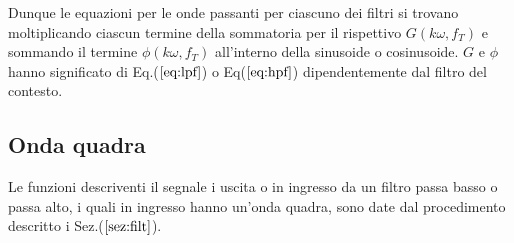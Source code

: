 \documentclass{article}
\begin{document}
    Dunque le equazioni per le onde passanti per ciascuno dei filtri si trovano
    moltiplicando ciascun termine della sommatoria per il rispettivo 
    $G \left( k\omega,f_T\right)$ e sommando il termine $\phi \left( k\omega,f_T\right)$ 
    all'interno della sinusoide o cosinusoide. $G$ e $\phi$ hanno significato di Eq.($\ref{eq:lpf}$)
    o Eq($\ref{eq:hpf}$) dipendentemente dal filtro del contesto.
      

    
    \subsection{Onda quadra}
    Le funzioni descriventi il segnale i uscita o in ingresso da un filtro passa basso
    o passa alto, i quali in ingresso hanno un'onda quadra, 
    sono date dal procedimento descritto i Sez.($\ref{sez:filt}$).
\end{document}
